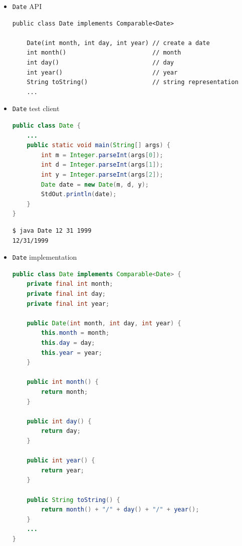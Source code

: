 \documentclass[8pt,a4paper,compress]{beamer}
\begin{document}
\begin{frame}[fragile]
\begin{itemize}
\item \lstinline{Date} API
\begin{lstlisting}[language={},mathescape]
public class Date implements Comparable<Date>

    Date(int month, int day, int year) // create a date
    int month()                        // month
    int day()                          // day
    int year()                         // year
    String toString()                  // string representation
    ...
\end{lstlisting}

\item \lstinline{Date} test client
\begin{lstlisting}[language=Java]
public class Date {
    ...
    public static void main(String[] args) {
        int m = Integer.parseInt(args[0]);
        int d = Integer.parseInt(args[1]);
        int y = Integer.parseInt(args[2]);
        Date date = new Date(m, d, y);
        StdOut.println(date);
    }
}
\end{lstlisting}

\begin{lstlisting}[language={}]
$ java Date 12 31 1999
12/31/1999
\end{lstlisting}
\end{itemize}
\end{frame}

\begin{frame}[fragile]
\begin{itemize}
\item \lstinline{Date} implementation
\begin{lstlisting}[language=Java]
public class Date implements Comparable<Date> {
    private final int month;
    private final int day;
    private final int year;
    
    public Date(int month, int day, int year) { 
        this.month = month; 
        this.day = day; 
        this.year = year; 
    }
    
    public int month() { 
        return month; 
    }

    public int day() { 
        return day; 
    }

    public int year() { 
        return year; 
    }
    
    public String toString() { 
        return month() + "/" + day() + "/" + year();
    }
    ...
}
\end{lstlisting}
\end{itemize}
\end{frame}
\end{document}
